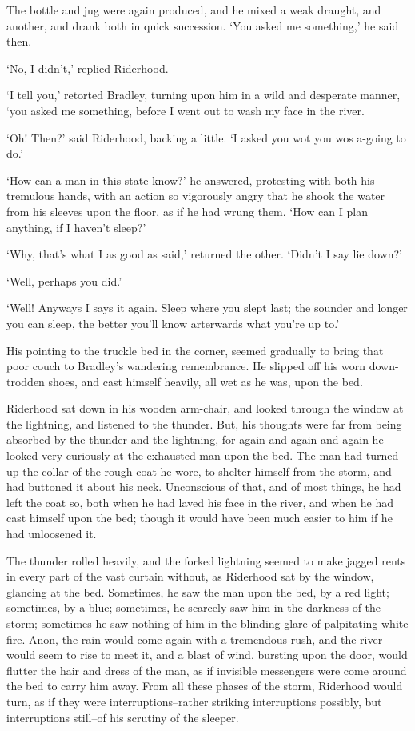 The bottle and jug were again produced, and he mixed a weak draught, and
another, and drank both in quick succession. ‘You asked me something,’
he said then.

‘No, I didn’t,’ replied Riderhood.

‘I tell you,’ retorted Bradley, turning upon him in a wild and desperate
manner, ‘you asked me something, before I went out to wash my face in
the river.

‘Oh! Then?’ said Riderhood, backing a little. ‘I asked you wot you wos
a-going to do.’

‘How can a man in this state know?’ he answered, protesting with both
his tremulous hands, with an action so vigorously angry that he shook
the water from his sleeves upon the floor, as if he had wrung them. ‘How
can I plan anything, if I haven’t sleep?’

‘Why, that’s what I as good as said,’ returned the other. ‘Didn’t I say
lie down?’

‘Well, perhaps you did.’

‘Well! Anyways I says it again. Sleep where you slept last; the sounder
and longer you can sleep, the better you’ll know arterwards what you’re
up to.’

His pointing to the truckle bed in the corner, seemed gradually to bring
that poor couch to Bradley’s wandering remembrance. He slipped off his
worn down-trodden shoes, and cast himself heavily, all wet as he was,
upon the bed.

Riderhood sat down in his wooden arm-chair, and looked through the
window at the lightning, and listened to the thunder. But, his thoughts
were far from being absorbed by the thunder and the lightning, for again
and again and again he looked very curiously at the exhausted man upon
the bed. The man had turned up the collar of the rough coat he wore,
to shelter himself from the storm, and had buttoned it about his neck.
Unconscious of that, and of most things, he had left the coat so, both
when he had laved his face in the river, and when he had cast himself
upon the bed; though it would have been much easier to him if he had
unloosened it.

The thunder rolled heavily, and the forked lightning seemed to make
jagged rents in every part of the vast curtain without, as Riderhood sat
by the window, glancing at the bed. Sometimes, he saw the man upon the
bed, by a red light; sometimes, by a blue; sometimes, he scarcely saw
him in the darkness of the storm; sometimes he saw nothing of him in
the blinding glare of palpitating white fire. Anon, the rain would come
again with a tremendous rush, and the river would seem to rise to meet
it, and a blast of wind, bursting upon the door, would flutter the hair
and dress of the man, as if invisible messengers were come around the
bed to carry him away. From all these phases of the storm, Riderhood
would turn, as if they were interruptions--rather striking interruptions
possibly, but interruptions still--of his scrutiny of the sleeper.

